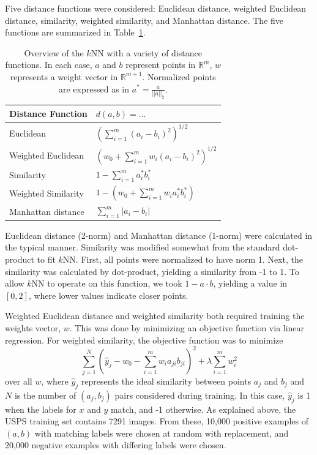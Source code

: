 \documentclass[10pt,twocolumn,letterpaper]{article}
\begin{document}
Five distance functions were considered: Euclidean distance, weighted Euclidean distance, similarity, weighted similarity, and Manhattan distance. The five functions are summarized in Table~\ref{tab:distfns}.

\begin{table}[b]
	\centering
	\begin{minipage}{7 cm}
		\begin{tabular}{ll}
			\toprule
			\bf{Distance Function} & $d(a,b) = \ldots$ \\
			\midrule
			Euclidean & $\left( \sum_{i=1}^m (a_i-b_i)^2 \right) ^{1/2}$ \\
			Weighted Euclidean & $ \left( w_0 + \sum_{i=1}^m w_i (a_i-b_i)^2 \right)^{1/2}$ \\
			Similarity & $1-\sum_{i=1}^m a^*_i b^*_i $ \\
			Weighted Similarity & $1-\left(w_0 + \sum_{i=1}^m w_i a^*_i b^*_i \right) $ \\
			Manhattan distance & $ \sum_{i=1}^m | a_i-b_i | $ \\
			\bottomrule
		\end{tabular}
		\caption{Overview of the $k$NN with a variety of distance functions. In each case, $a$ and $b$ represent points in $\mathbb{R}^m$, $w$ represents a weight vector in $\mathbb{R}^{m+1}$. Normalized points are expressed as in $a^* = \frac{a}{||a||_2}$. }
		\label{tab:distfns}
	\end{minipage}
\end{table}

Euclidean distance (2-norm) and Manhattan distance (1-norm) were calculated in the typical manner. Similarity was modified somewhat from the standard dot-product to fit $k$NN. First, all points were normalized to have norm 1. Next, the similarity was calculated by dot-product, yielding a similarity from -1 to 1. To allow $k$NN to operate on this function, we took $1-a\cdot b$, yielding a value in $[0,2]$, where lower values indicate closer points.

Weighted Euclidean distance and weighted similarity both required training the weights vector, $w$. This was done by minimizing an objective function via linear regression. 
For weighted similarity, the objective function was to minimize
\[ \sum_{j=1}^N \left( \hat{y}_j - w_0 - \sum_{i=1}^m w_i a_{ji} b_{ji}  \right) ^2  + \lambda \sum_{i=1}^m w_i^2 \]
over all $w$, where $\hat{y}_j$ represents the ideal similarity between points $a_j$ and $b_j$ and $N$ is the number of $(a_j,b_j)$ pairs considered during training. In this case, $\hat{y}_j$ is 1 when the labels for $x$ and $y$ match, and -1 otherwise. As explained above, the USPS training set contains 7291 images. From these, 10,000 positive examples of $(a,b)$ with matching labels were chosen at random with replacement, and 20,000 negative examples with differing labels were chosen.
\end{document}
